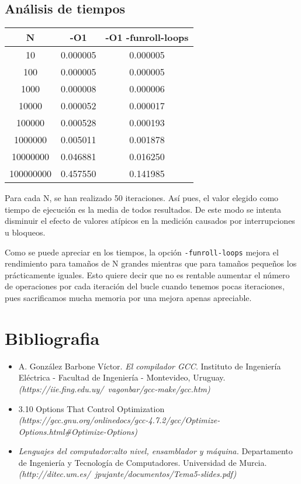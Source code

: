 \documentclass[10pt,a4paper]{article}
\begin{document}
\subsection{Análisis de tiempos}
\begin{center}

\begin{tabular}{|c|c|c|}
\hline 
 \textbf{N} & \textbf{-O1} & \textbf{-O1 -funroll-loops }\\ 
\hline 
10 & 0.000005 & 0.000005 \\ 
\hline 
100 & 0.000005 & 0.000005 \\ 
\hline 
1000 & 0.000008 & 0.000006 \\ 
\hline 
10000 & 0.000052 & 0.000017 \\ 
\hline 
100000 & 0.000528 & 0.000193 \\ 
\hline 
1000000 & 0.005011 & 0.001878 \\ 
\hline 
10000000 & 0.046881 & 0.016250 \\ 
\hline 
100000000 &  0.457550 & 0.141985 \\ 
\hline 
\end{tabular} 

\end{center}
Para cada N, se han realizado 50 iteraciones. Así pues, el valor elegido como tiempo de ejecución es la media de todos resultados. De este modo se intenta disminuir el efecto de valores atípicos en la medición causados por interrupciones u bloqueos.  

Como se puede apreciar en los tiempos, la opción \texttt{-funroll-loops} mejora el rendimiento para tamaños de N grandes mientras que para tamaños pequeños los prácticamente iguales. Esto quiere decir que no es rentable aumentar el número de operaciones por cada iteración del bucle cuando tenemos pocas iteraciones, pues sacrificamos mucha memoria por una mejora apenas apreciable. 

\section{Bibliografia}
\begin{itemize}
	\item 
 A. González Barbone Víctor.  \textit{El compilador GCC}. Instituto de Ingeniería Eléctrica - Facultad de Ingeniería - Montevideo, Uruguay. \textit{(https://iie.fing.edu.uy/~vagonbar/gcc-make/gcc.htm)}
 
	\item 3.10 Options That Control Optimization \\
	\textit{ (https://gcc.gnu.org/onlinedocs/gcc-4.7.2/gcc/Optimize-Options.html\#Optimize-Options)}
	\item \textit{Lenguajes del computador:alto nivel, ensamblador y máquina.} Departamento de Ingeniería y Tecnología de Computadores. Universidad de Murcia. \textit{ (http://ditec.um.es/~jpujante/documentos/Tema5-slides.pdf)}
\end{itemize}
\end{document}

